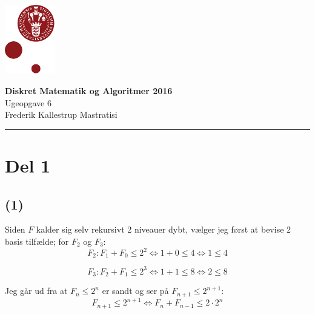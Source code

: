 \documentclass[12pt, a4paper, hidelinks]{article}
\begin{document}
\begin{minipage}[b]{1.0\linewidth}
\includegraphics[height=30mm]{KULogo}

\vspace*{-16ex}
\begin{center}
    {\Large \bf Diskret Matematik og Algoritmer 2016} \vspace*{1ex} \\
    {\large Ugeopgave 6} \vspace*{1ex} \\
    {\large Frederik Kallestrup Mastratisi}
\end{center}
\vspace*{-3pt}
{\color{KU-red}\hrule}
\end{minipage}
\vspace{2ex}

\tableofcontents \newpage

\setcounter{section}{0}
\setcounter{subsection}{-1}

\section{ Del 1}
\subsection{(1)}
Siden $F$ kalder sig selv rekursivt 2 niveauer dybt, vælger jeg først at bevise 2 basis tilfælde; for $F_2$ og $F_3$:
\begin{equation}F_2: F_1 + F_0 \leq 2^2 \iff 1 + 0 \leq 4 \iff  1 \leq 4  \end{equation}

\begin{equation}F_3: F_2 + F_1 \leq 2^3 \iff 1 + 1 \leq 8 \iff 2 \leq 8 \end{equation}

Jeg går ud fra at $F_n \leq 2^n$ er sandt og ser på $F_{n +1} \leq 2^{n +1}$:
\begin{equation} F_{n +1} \leq 2^{n +1} \iff F_n + F_{n -1} \leq 2 \cdot 2^n \end{equation}
\end{document}
